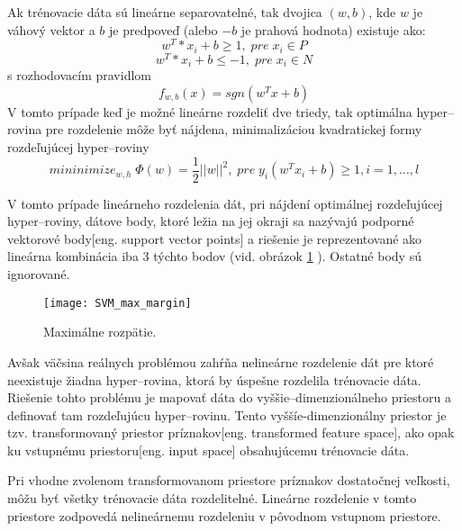 Ak trénovacie dáta sú lineárne separovatelné, tak dvojica $(w, b)$, kde $w$ je váhový vektor a $b$ je predpoveď
    (alebo $-b$ je prahová hodnota) existuje ako\cite{prop:SupervisedMachineLearning}:
\begin{equation}
    \label{eq:SVMPair1}
    w^T * x_i + b \geq 1, \; pre \; x_i \in P
\end{equation}
\begin{equation}
    \label{eq:SVMPair2}
    w^T * x_i + b \leq -1, \; pre \; x_i \in N
\end{equation}
s rozhodovacím pravidlom
\begin{equation}
    \label{eq:SVMDecisionRule}
    f_{w,b}(x) = sgn(w^T x + b)
\end{equation}
V tomto prípade keď je možné lineárne rozdeliť dve triedy, tak optimálna hyper--rovina pre rozdelenie
    môže byť nájdena, minimalizáciou kvadratickej formy rozdeľujúcej hyper--roviny
\begin{equation}
    \label{eq:SVMDecisionRule}
    mininimize_{w,h} \; \Phi(w) = \frac{1}{2}||w||^2, \; pre \; y_i(w^Tx_i + b) \geq 1, i = 1, \dots, l
\end{equation}

V tomto prípade lineárneho rozdelenia dát, pri nájdení optimálnej rozdeľujúcej hyper--roviny, dátove body, ktoré ležia na jej okraji
    sa nazývajú podporné vektorové body[eng. support vector points] a riešenie je reprezentované ako lineárna kombinácia iba 3 týchto bodov (vid. obrázok \ref{pic:SVMMAxMargin} ).
Ostatné body sú ignorované\cite{prop:SupervisedMachineLearning}.

\begin{figure}[H]
	\centering
	\texttt{[image: SVM\_max\_margin]}
	\caption{Maximálne rozpätie\cite{prop:SupervisedMachineLearning}.}
	\label{pic:SVMMAxMargin}
\end{figure}

Avšak väčsina reálnych problémou zahŕňa nelineárne rozdelenie dát pre ktoré neexistuje žiadna hyper--rovina, ktorá by úspešne rozdelila trénovacie dáta.
Riešenie tohto problému je mapovať dáta do vyššie--dimenzionálneho priestoru a definovať tam rozdeľujúcu hyper--rovinu.
Tento vyššíe-dimenzionálny priestor je tzv. transformovaný priestor príznakov[eng. transformed feature space], ako opak ku vstupnému priestoru[eng. input space] obsahujúcemu trénovacie dáta\cite{prop:SupervisedMachineLearning}.

Pri vhodne zvolenom transformovanom priestore príznakov dostatočnej veľkosti, môžu byť všetky trénovacie dáta rozdelitelné.
Lineárne rozdelenie v tomto priestore zodpovedá nelineárnemu rozdeleniu v pôvodnom vstupnom priestore.

